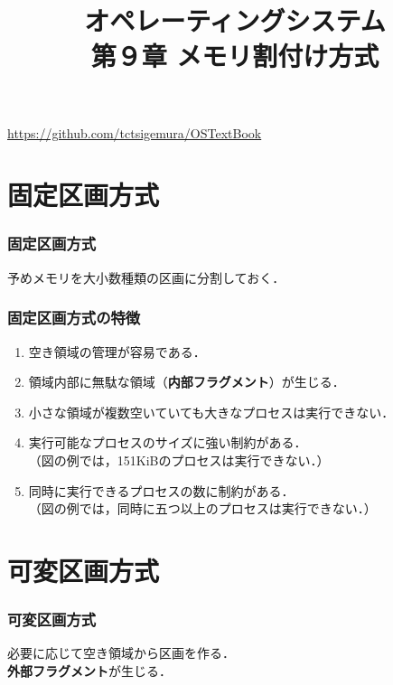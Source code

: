 \documentclass{beamer}                   %
\begin{document}
\title[メモリ割付け方式]
      {オペレーティングシステム\\第９章 メモリ割付け方式}
\date{}
\begin{frame}
  \titlepage
  \centerline{\url{https://github.com/tctsigemura/OSTextBook}}
\end{frame}


\section{固定区画方式}
\begin{frame}
  \frametitle{固定区画方式}
  予めメモリを大小数種類の区画に分割しておく．
\end{frame}

\begin{frame}
  \frametitle{固定区画方式の特徴}
  \begin{enumerate}
  \item 空き領域の管理が容易である．
  \item 領域内部に無駄な領域（{\bf 内部フラグメント}）が生じる．
  \item 小さな領域が複数空いていても大きなプロセスは実行できない．
  \item 実行可能なプロセスのサイズに強い制約がある．\\
    （図の例では，151KiBのプロセスは実行できない．）
  \item 同時に実行できるプロセスの数に制約がある．\\
    （図の例では，同時に五つ以上のプロセスは実行できない．）
  \end{enumerate}
\end{frame}

\section{可変区画方式}
\begin{frame}
  \frametitle{可変区画方式}
  必要に応じて空き領域から区画を作る．\\
  {\bf 外部フラグメント}が生じる．
\end{frame}
\end{document}
